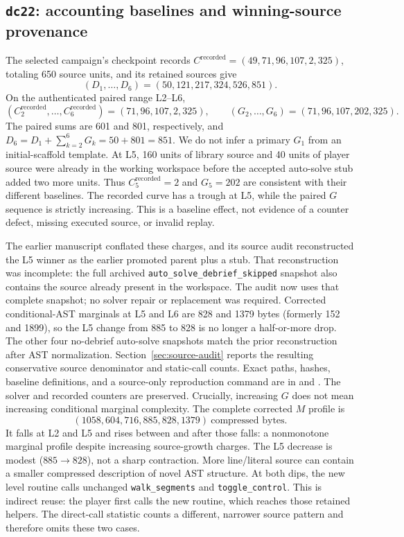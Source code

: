 \documentclass[11pt]{article}
\theoremstyle{definition}
\theoremstyle{remark}
\begin{document}
\subsection{\texttt{dc22}: accounting baselines and winning-source provenance}
\label{sec:dc22}
The selected campaign's checkpoint records
$C^{\mathrm{recorded}}=(49,71,96,107,2,325)$, totaling 650 source units, and
its retained sources give
\[
 (D_1,\ldots,D_6)=(50,121,217,324,526,851).
\]
On the authenticated paired range L2--L6,
\[
 (C_2^{\mathrm{recorded}},\ldots,C_6^{\mathrm{recorded}})=(71,96,107,2,325),
 \qquad (G_2,\ldots,G_6)=(71,96,107,202,325).
\]
The paired sums are 601 and 801, respectively, and
$D_6=D_1+\sum_{k=2}^{6}G_k=50+801=851$. We do not infer a primary $G_1$
from an initial-scaffold template. At L5, 160 units of library source and 40 units
of player source were already in the working workspace before the accepted
auto-solve stub added two more units. Thus $C_5^{\mathrm{recorded}}=2$ and $G_5=202$
are consistent with their different baselines. The recorded curve has a trough
at L5, while the paired $G$ sequence is strictly increasing. This is a baseline
effect, not evidence of a counter defect, missing executed source, or invalid replay.

The earlier manuscript conflated these charges, and its source audit reconstructed
the L5 winner as the earlier promoted parent plus a stub. That reconstruction was
incomplete: the full archived \texttt{auto\_solve\_debrief\_skipped} snapshot also
contains the source already present in the workspace. The audit now uses that
complete snapshot; no solver repair or replacement was required. Corrected
conditional-AST marginals at L5 and L6 are 828 and 1379 bytes (formerly 152 and
1899), so the L5 change from 885 to 828 is no longer a half-or-more drop. The
other four no-debrief auto-solve snapshots match the prior reconstruction after AST
normalization. Section~\ref{sec:source-audit} reports the resulting conservative
source denominator and static-call counts. Exact paths, hashes, baseline definitions,
and a source-only reproduction command are in  and
. The solver and recorded counters are
preserved. Crucially, increasing $G$ does not mean increasing conditional marginal
complexity. The complete corrected $M$ profile is
\[
 (1058,604,716,885,828,1379)\ \text{compressed bytes}.
\]
It falls at L2 and L5 and rises between and after those falls: a nonmonotone marginal
profile despite increasing source-growth charges. The L5 decrease is modest
($885\to828$), not a sharp contraction. More line/literal source can contain a
smaller compressed description of novel AST structure. At both dips, the new
level routine calls unchanged \texttt{walk\_segments} and \texttt{toggle\_control}.
This is indirect reuse: the player first calls the new routine, which reaches
those retained helpers. The direct-call statistic counts a different, narrower
source pattern and therefore omits these two cases.
\end{document}

